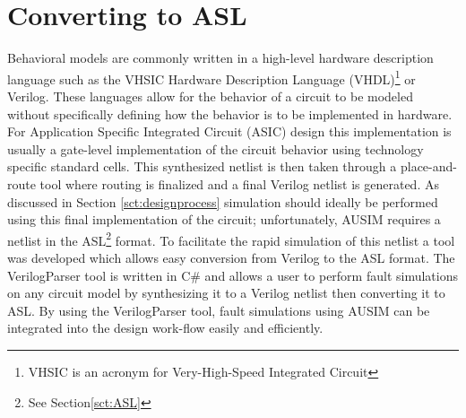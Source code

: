 \documentclass[12pt]{report}
\begin{document}
\section{Converting to ASL}
Behavioral models are commonly written in a high-level hardware description language such as the VHSIC Hardware Description Language (VHDL)\footnote{VHSIC is an acronym for Very-High-Speed Integrated Circuit} or Verilog.  These languages allow for the behavior of a circuit to be modeled without specifically defining how the behavior is to be implemented in hardware.  For Application Specific Integrated Circuit (ASIC) design this implementation is usually a gate-level implementation of the circuit behavior using technology specific standard cells.  This synthesized netlist is then taken through a place-and-route tool where routing is finalized and a final Verilog netlist is generated\cite{advancedverilog}.  As discussed in Section \ref{sct:designprocess} simulation should ideally be performed using this final implementation of the circuit; unfortunately, AUSIM requires a netlist in the ASL\footnote{See Section\ref{sct:ASL}} format.   To facilitate the rapid simulation of this netlist a tool was developed which allows easy conversion from Verilog to the ASL format.  The VerilogParser tool is written in C\#\cite{csharp} and allows a user to perform fault simulations on any circuit model by synthesizing it to a Verilog netlist then converting it to ASL.  By using the VerilogParser tool, fault simulations using AUSIM can be integrated into the design work-flow easily and efficiently.
\end{document}
